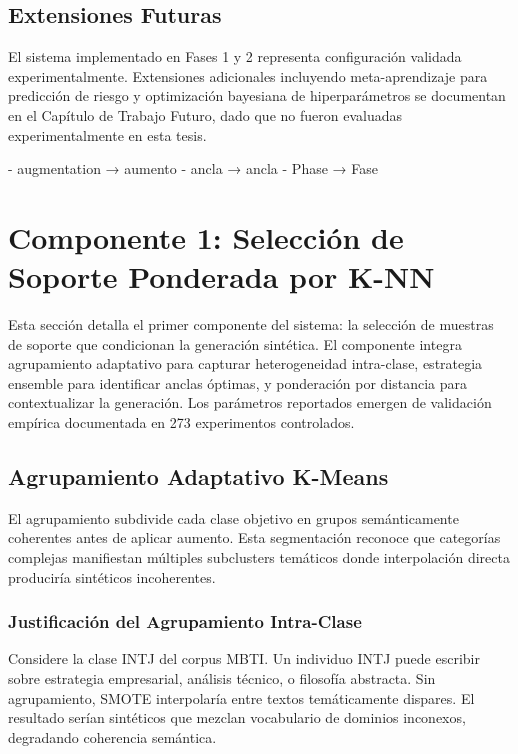 \subsection{Extensiones Futuras}
\label{subsec:extensiones_futuras}

El sistema implementado en Fases 1 y 2 representa configuración validada experimentalmente. Extensiones adicionales incluyendo meta-aprendizaje para predicción de riesgo y optimización bayesiana de hiperparámetros se documentan en el Capítulo de Trabajo Futuro, dado que no fueron evaluadas experimentalmente en esta tesis.



- augmentation → aumento
- ancla → ancla
- Phase → Fase
\section{Componente 1: Selección de Soporte Ponderada por K-NN}
\label{sec:seleccion_knn}

Esta sección detalla el primer componente del sistema: la selección de muestras de soporte que condicionan la generación sintética. El componente integra agrupamiento adaptativo para capturar heterogeneidad intra-clase, estrategia ensemble para identificar anclas óptimas, y ponderación por distancia para contextualizar la generación. Los parámetros reportados emergen de validación empírica documentada en 273 experimentos controlados.

\subsection{Agrupamiento Adaptativo K-Means}
\label{subsec:clustering}

El agrupamiento subdivide cada clase objetivo en grupos semánticamente coherentes antes de aplicar aumento. Esta segmentación reconoce que categorías complejas manifiestan múltiples subclusters temáticos donde interpolación directa produciría sintéticos incoherentes.

\subsubsection*{Justificación del Agrupamiento Intra-Clase}

Considere la clase INTJ del corpus MBTI. Un individuo INTJ puede escribir sobre estrategia empresarial, análisis técnico, o filosofía abstracta. Sin agrupamiento, SMOTE interpolaría entre textos temáticamente dispares. El resultado serían sintéticos que mezclan vocabulario de dominios inconexos, degradando coherencia semántica.

